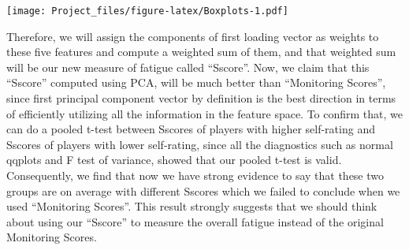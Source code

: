 \documentclass[]{article}
\newenvironment{Shaded}{\begin{snugshade}}{\end{snugshade}}
\newcommand{\DataTypeTok}[1]{\textcolor[rgb]{0.13,0.29,0.53}{#1}}
\newcommand{\DecValTok}[1]{\textcolor[rgb]{0.00,0.00,0.81}{#1}}
\newcommand{\KeywordTok}[1]{\textcolor[rgb]{0.13,0.29,0.53}{\textbf{#1}}}
\newcommand{\NormalTok}[1]{#1}
\newcommand{\OperatorTok}[1]{\textcolor[rgb]{0.81,0.36,0.00}{\textbf{#1}}}
\newcommand{\StringTok}[1]{\textcolor[rgb]{0.31,0.60,0.02}{#1}}
\begin{document}
\begin{Shaded}
\end{Shaded}

\texttt{[image: Project\_files/figure-latex/Boxplots-1.pdf]}

\begin{Shaded}
\end{Shaded}

Therefore, we will assign the components of first loading vector as
weights to these five features and compute a weighted sum of them, and
that weighted sum will be our new measure of fatigue called ``Sscore''.
Now, we claim that this ``Sscore'' computed using PCA, will be much
better than ``Monitoring Scores'', since first principal component
vector by definition is the best direction in terms of efficiently
utilizing all the information in the feature space. To confirm that, we
can do a pooled t-test between Sscores of players with higher
self-rating and Sscores of players with lower self-rating, since all the
diagnostics such as normal qqplots and F test of variance, showed that
our pooled t-test is valid. Consequently, we find that now we have
strong evidence to say that these two groups are on average with
different Sscores which we failed to conclude when we used ``Monitoring
Scores''. This result strongly suggests that we should think about using
our ``Sscore'' to measure the overall fatigue instead of the original
Monitoring Scores.
\end{document}
